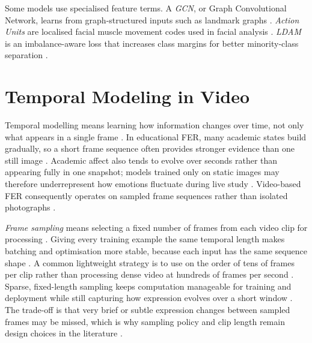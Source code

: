 Some models use specialised feature terms. A \emph{GCN}, or Graph Convolutional Network, learns from graph-structured inputs such as landmark graphs \cite{rianto_engagement_2025}. \emph{Action Units} are localised facial muscle movement codes used in facial analysis \cite{santoni_convolutional_2023,rianto_engagement_2025}. \emph{LDAM} is an imbalance-aware loss that increases class margins for better minority-class separation \cite{rianto_engagement_2025}.

\section{Temporal Modeling in Video}\label{sec:bg:temporal}

Temporal modelling means learning how information changes over time, not only what appears in a single frame \cite{asaju_adaptive_2022,mehta_three-dimensional_2022}. In educational FER, many academic states build gradually, so a short frame sequence often provides stronger evidence than one still image \cite{abedi_improving_2021}. Academic affect also tends to evolve over seconds rather than appearing fully in one snapshot; models trained only on static images may therefore underrepresent how emotions fluctuate during live study \cite{lek_academic_2023}. Video-based FER consequently operates on sampled frame sequences rather than isolated photographs \cite{asaju_adaptive_2022,rao_recognition_2021}.

\emph{Frame sampling} means selecting a fixed number of frames from each video clip for processing \cite{abedi_improving_2021}. Giving every training example the same temporal length makes batching and optimisation more stable, because each input has the same sequence shape \cite{mehta_three-dimensional_2022}. A common lightweight strategy is to use on the order of tens of frames per clip rather than processing dense video at hundreds of frames per second \cite{asaju_adaptive_2022,abedi_improving_2021}. Sparse, fixed-length sampling keeps computation manageable for training and deployment while still capturing how expression evolves over a short window \cite{lek_academic_2023,rao_recognition_2021}. The trade-off is that very brief or subtle expression changes between sampled frames may be missed, which is why sampling policy and clip length remain design choices in the literature \cite{mehta_three-dimensional_2022}.

